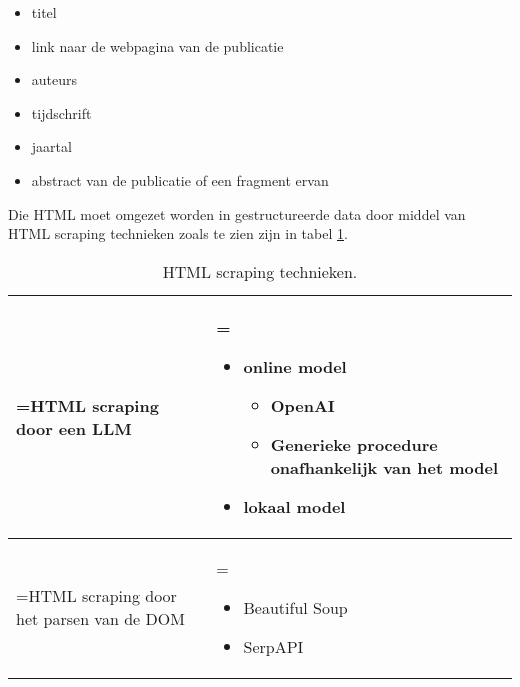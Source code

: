 \begin{itemize}
    \item titel
    \item link naar de webpagina van de publicatie
    \item auteurs
    \item tijdschrift
    \item jaartal
    \item abstract van de publicatie of een fragment ervan
\end{itemize}
Die HTML moet omgezet worden in gestructureerde data door middel van HTML scraping technieken zoals te zien zijn in tabel \ref{table:HTML scraping technieken}.
\begin{table}[h!]
    \begin{tabularx}{\textwidth}{|>{\hsize=1.0\hsize\linewidth=\hsize}X
            |>{\hsize=1.0\hsize\linewidth=\hsize}X|}
        \hline
        HTML scraping door een LLM &
        \begin{itemize}
            \item online model
            \begin{itemize}
                \item OpenAI
                \item Generieke procedure onafhankelijk van het model
            \end{itemize}
            \item lokaal model
        \end{itemize}
         \\
        \hline
         HTML scraping door het parsen van de DOM &
        \begin{itemize}
            \item Beautiful Soup
            \item SerpAPI
        \end{itemize}\\
        \hline
    \end{tabularx}
    \caption{HTML scraping technieken.}
    \label{table:HTML scraping technieken}
\end{table}

